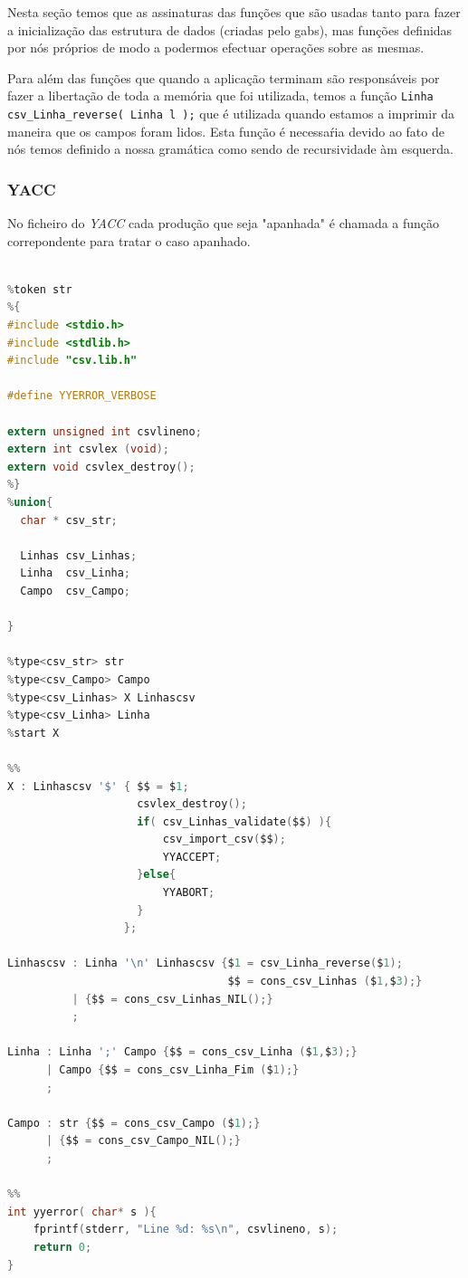\documentclass[11pt, a4paper, oneside]{article}
\begin{document}
Nesta seção temos que as assinaturas das funções que são usadas tanto para fazer a inicialização das estrutura de dados (criadas pelo gabs), mas funções definidas por nós próprios de modo a podermos efectuar operações sobre as mesmas.

Para além das funções que quando a aplicação terminam são responsáveis por fazer a libertação de toda a memória que foi utilizada, temos a função \texttt{Linha csv\_Linha\_reverse( Linha l );} que é utilizada quando estamos a imprimir da maneira que os campos foram lidos. Esta função é necessaŕia devido ao fato de nós temos definido a nossa gramática como sendo de recursividade àm esquerda.

\newpage

\subsubsection{YACC}
No ficheiro do \textit{YACC} cada produção que seja "apanhada" é chamada a função correpondente para tratar o caso apanhado.

\begin{lstlisting}[language=C, caption={YACC do ficheiro de resultados.}]

%token str
%{
#include <stdio.h>
#include <stdlib.h>
#include "csv.lib.h"

#define YYERROR_VERBOSE

extern unsigned int csvlineno;
extern int csvlex (void);
extern void csvlex_destroy();
%}
%union{
  char * csv_str;
  
  Linhas csv_Linhas;
  Linha  csv_Linha;
  Campo  csv_Campo;

} 

%type<csv_str> str
%type<csv_Campo> Campo
%type<csv_Linhas> X Linhascsv
%type<csv_Linha> Linha
%start X

%%
X : Linhascsv '$' { $$ = $1; 
                    csvlex_destroy();
                    if( csv_Linhas_validate($$) ){
                        csv_import_csv($$);
                        YYACCEPT;
                    }else{
                        YYABORT;
                    }
                  };

Linhascsv : Linha '\n' Linhascsv {$1 = csv_Linha_reverse($1);
                                  $$ = cons_csv_Linhas ($1,$3);}
          | {$$ = cons_csv_Linhas_NIL();}
          ;

Linha : Linha ';' Campo {$$ = cons_csv_Linha ($1,$3);}
      | Campo {$$ = cons_csv_Linha_Fim ($1);}
      ;

Campo : str {$$ = cons_csv_Campo ($1);}
      | {$$ = cons_csv_Campo_NIL();}
      ;

%%
int yyerror( char* s ){
    fprintf(stderr, "Line %d: %s\n", csvlineno, s);
    return 0;
}
\end{lstlisting}
\end{document}
